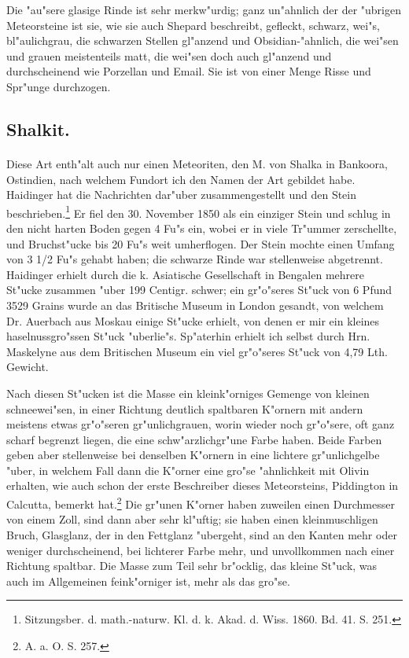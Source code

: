\documentclass[a4paper, 11pt, oneside]{article}
\begin{document}
Die "au"sere glasige Rinde ist sehr merkw"urdig; ganz un"ahnlich der der "ubrigen Meteorsteine ist sie, wie sie auch Shepard beschreibt, gefleckt, schwarz, wei"s, bl"aulichgrau, die schwarzen Stellen gl"anzend und Obsidian-"ahnlich, die wei"sen und grauen meistenteils matt, die wei"sen doch auch gl"anzend und durchscheinend wie Porzellan und Email. Sie ist von einer Menge Risse und Spr"unge durchzogen.
\subsection{Shalkit.}
\paragraph{}
Diese Art enth"alt auch nur einen Meteoriten, den M. von Shalka in Bankoora, Ostindien, nach welchem Fundort ich den Namen der Art gebildet habe. Haidinger hat die Nachrichten dar"uber zusammengestellt und den Stein beschrieben.\footnote{Sitzungsber. d. math.-naturw. Kl. d. k. Akad. d. Wiss. 1860. Bd. 41. S. 251.} Er fiel den 30. November 1850 als ein einziger Stein und schlug in den nicht harten Boden gegen 4 Fu"s ein, wobei er in viele Tr"ummer zerschellte, und Bruchst"ucke bis 20 Fu"s weit umherflogen. Der Stein mochte einen Umfang von 3 1/2 Fu"s gehabt haben; die schwarze Rinde war stellenweise abgetrennt. Haidinger erhielt durch die k. Asiatische Gesellschaft in Bengalen mehrere St"ucke zusammen "uber 199 Centigr. schwer; ein gr"o"seres St"uck von 6 Pfund 3529 Grains wurde an das Britische Museum in London gesandt, von welchem Dr. Auerbach aus Moskau einige St"ucke erhielt, von denen er mir ein kleines haselnussgro"ssen St"uck "uberlie"s. Sp"aterhin erhielt ich selbst durch Hrn. Maskelyne aus dem Britischen Museum ein viel gr"o"seres St"uck von 4,79 Lth. Gewicht.

Nach diesen St"ucken ist die Masse ein kleink"orniges Gemenge von kleinen schneewei"sen, in einer Richtung deutlich spaltbaren K"ornern mit andern meistens etwas gr"o"seren gr"unlichgrauen, worin wieder noch gr"o"sere, oft ganz scharf begrenzt liegen, die eine schw"arzlichgr"une Farbe haben. Beide Farben geben aber stellenweise bei denselben K"ornern in eine lichtere gr"unlichgelbe "uber, in welchem Fall dann die K"orner eine gro"se "ahnlichkeit mit Olivin erhalten, wie auch schon der erste Beschreiber dieses Meteorsteins, Piddington in Calcutta, bemerkt hat.\footnote{A. a. O. S. 257.} Die gr"unen K"orner haben zuweilen einen Durchmesser von einem Zoll, sind dann aber sehr kl"uftig; sie haben einen kleinmuschligen Bruch, Glasglanz, der in den Fettglanz "ubergeht, sind an den Kanten mehr oder weniger durchscheinend, bei lichterer Farbe mehr, und unvollkommen nach einer Richtung spaltbar. Die Masse zum Teil sehr br"ocklig, das kleine St"uck, was auch im Allgemeinen feink"orniger ist, mehr als das gro"se.
\end{document}
